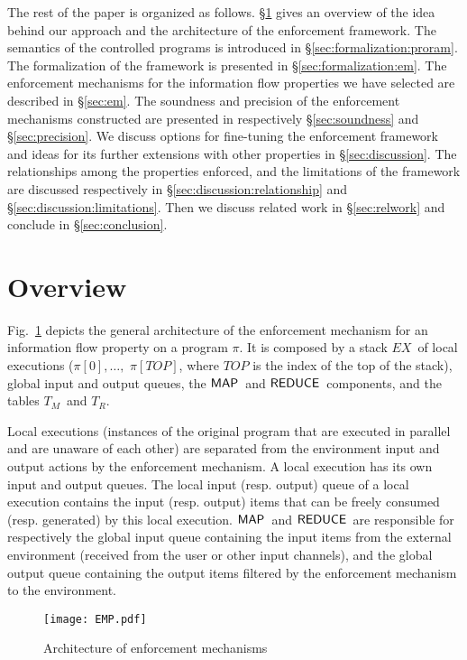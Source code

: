 \documentclass[10pt,a4paper,oneside]{article}
\def\TAV{\ensuremath{T_{M}}}
\def\TPV{\ensuremath{T_{R}}}
\def\ST{{\ensuremath{EX}}}
\def\TOP{\ensuremath{TOP}}
\def\sanserif#1{\ensuremath{\sf #1}}
\def\REDUCE{\ensuremath{\sanserif{REDUCE}}}
\def\MAP{\ensuremath{\sanserif{MAP}}}
\def\Prog{\ensuremath{\pi}}
\begin{document}
The rest of the paper is organized as follows. \S\ref{sec:overview} gives an overview of the idea behind our approach and the architecture of the enforcement framework. The semantics of the controlled programs is introduced in \S\ref{sec:formalization:proram}. The formalization of the framework is presented in \S\ref{sec:formalization:em}. The enforcement mechanisms for the information flow properties we have selected are described in \S\ref{sec:em}. The soundness and precision of the enforcement mechanisms constructed are presented in respectively \S\ref{sec:soundness} and \S\ref{sec:precision}. We discuss options for fine-tuning the enforcement framework and ideas for its further extensions with other properties  in \S\ref{sec:discussion}. The relationships among the properties enforced, and the limitations of the framework are discussed respectively in \S\ref{sec:discussion:relationship} and \S\ref{sec:discussion:limitations}. Then we discuss related work in \S\ref{sec:relwork} and conclude in \S\ref{sec:conclusion}.


\section{Overview}\label{sec:overview}
Fig.~\ref{fig:archiectureEMP} depicts the general architecture of the enforcement mechanism for an information flow property on a program \Prog. It is composed by a stack \ST\ of local executions ($\Prog[0], \dots,$ $\Prog[\TOP]$, where $\TOP$ is the index of the top of the stack), global input and output queues, the \MAP\ and \REDUCE\ components, and the tables \TAV\ and \TPV.


Local executions (instances of the original program that are executed in parallel and are unaware of each other) are separated from the environment input and output actions by the enforcement mechanism. A local execution has its own input and output queues. The local input (resp. output) queue of a local execution contains the input (resp. output) items that can be freely consumed (resp. generated) by this local execution. \MAP\ and \REDUCE\ are responsible for respectively the global input queue containing the input items from the external environment (received from the user or other input channels), and the global output queue containing the output items filtered by the enforcement mechanism to the environment.


\begin{figure}
\centering
\texttt{[image: EMP.pdf]}
\caption{Architecture of enforcement mechanisms}
\label{fig:archiectureEMP}
\end{figure}
\end{document}
